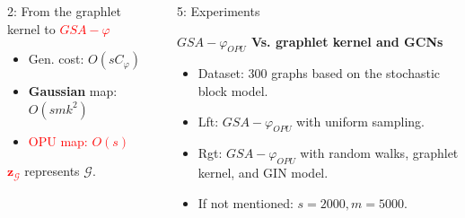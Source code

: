 \documentclass[final,dvipsnames]{beamer}
\newcommand{\vsp}{\vspace{10pt}}
\newcommand{\myemph}[1]{\textcolor{red}{#1}}
\begin{document}
\begin{frame}{}
\begin{columns}[t]
\begin{column}{0.45\linewidth}
\begin{block}{2: From the graphlet kernel to \myemph{$GSA-\varphi$}}
{}
\hfill
\parbox{0.35\textwidth}{
	\large
	\begin{itemize}
		\item  Gen. cost: $O(s C_{\varphi})$
		\vsp
		\item \textbf{Gaussian} map: $O(s m k^2)$
		\vsp
		\item \myemph{OPU map: $O(s)$}
	\end{itemize}
}

\vspace{1cm}
\large
\hspace {12cm}\myemph{$\mathbf{z}_\mathcal{G}$ }represents $\mathcal{G}$.
\end{block}

\end{column}









\begin{column}{0.29\linewidth}
	
	
\begin{myalertblock}{5: Experiments}
\vspace{0.5cm}

\hspace*{.0\linewidth}\begin{minipage}{.99\linewidth}
	\begin{mynotablock}{\textbf{$GSA-\varphi_{OPU}$ Vs. graphlet kernel and GCNs}}
		\small
		\begin{itemize}
			\item Dataset: 300 graphs based on the stochastic block model.
			\item Lft: $GSA-\varphi_{OPU}$ with uniform sampling. 
			\item Rgt: $GSA-\varphi_{OPU}$ with random walks, graphlet kernel, and GIN model.
			\item If not mentioned: $s= 2000, m=5000$.
			

\end{itemize}
\end{mynotablock}
\end{minipage}
\end{myalertblock}
\end{column}
\end{columns}
\end{frame}
\end{document}
